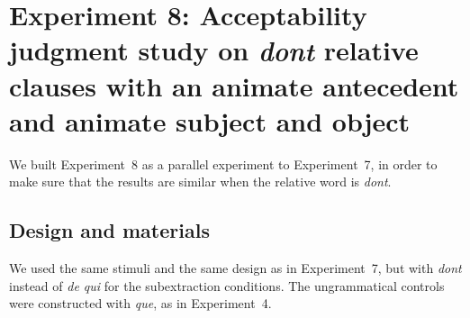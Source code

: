 \section[head=Experiment 8]{Experiment 8: Acceptability judgment study on \emph{dont} relative clauses with an animate antecedent and animate subject and object}

We built Experiment~8 as a parallel experiment to Experiment~7, in order to make sure that the results are similar when the relative word is \emph{dont}. 

\subsection{Design and materials}
We used the same stimuli and the same design as in Experiment~7, but with \emph{dont} instead of \emph{de qui} for the subextraction conditions. The ungrammatical controls were constructed with \emph{que}, as in Experiment~4. 

